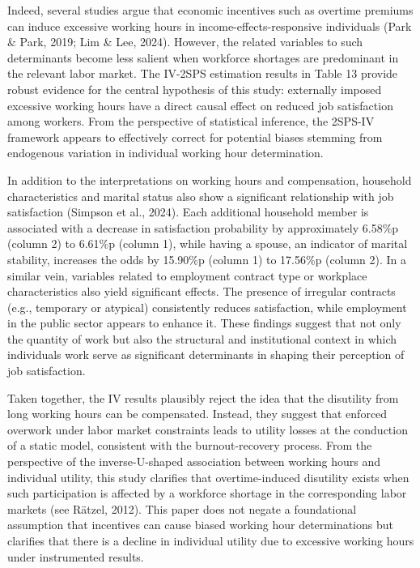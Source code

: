 \documentclass[
  12pt,
]{article}
\begin{document}
Indeed, several studies argue that economic incentives such as overtime
premiums can induce excessive working hours in income-effects-responsive
individuals (Park \& Park, 2019; Lim \& Lee, 2024). However, the related
variables to such determinants become less salient when workforce
shortages are predominant in the relevant labor market. The IV-2SPS
estimation results in Table 13 provide robust evidence for the central
hypothesis of this study: externally imposed excessive working hours
have a direct causal effect on reduced job satisfaction among workers.
From the perspective of statistical inference, the 2SPS-IV framework
appears to effectively correct for potential biases stemming from
endogenous variation in individual working hour determination.

In addition to the interpretations on working hours and compensation,
household characteristics and marital status also show a significant
relationship with job satisfaction (Simpson et al., 2024). Each
additional household member is associated with a decrease in
satisfaction probability by approximately 6.58\%p (column 2) to 6.61\%p
(column 1), while having a spouse, an indicator of marital stability,
increases the odds by 15.90\%p (column 1) to 17.56\%p (column 2). In a
similar vein, variables related to employment contract type or workplace
characteristics also yield significant effects. The presence of
irregular contracts (e.g., temporary or atypical) consistently reduces
satisfaction, while employment in the public sector appears to enhance
it. These findings suggest that not only the quantity of work but also
the structural and institutional context in which individuals work serve
as significant determinants in shaping their perception of job
satisfaction.

Taken together, the IV results plausibly reject the idea that the
disutility from long working hours can be compensated. Instead, they
suggest that enforced overwork under labor market constraints leads to
utility losses at the conduction of a static model, consistent with the
burnout-recovery process. From the perspective of the inverse-U-shaped
association between working hours and individual utility, this study
clarifies that overtime-induced disutility exists when such
participation is affected by a workforce shortage in the corresponding
labor markets (see Rätzel, 2012). This paper does not negate a
foundational assumption that incentives can cause biased working hour
determinations but clarifies that there is a decline in individual
utility due to excessive working hours under instrumented results.
\end{document}
